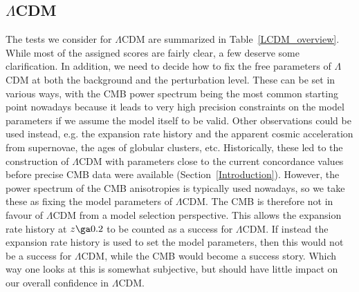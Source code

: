 \documentclass[fleqn,usenatbib,useAMS]{mnras} %
\begin{document}
\subsection{\texorpdfstring{$\Lambda$}{L}CDM}
\label{LCDM_comparison_section}

The tests we consider for $\Lambda$CDM are summarized in Table~\ref{LCDM_overview}. While most of the assigned scores are fairly clear, a few deserve some clarification. In addition, we need to decide how to fix the free parameters of $\Lambda$CDM at both the background and the perturbation level. These can be set in various ways, with the CMB power spectrum being the most common starting point nowadays because it leads to very high precision constraints on the model parameters if we assume the model itself to be valid. Other observations could be used instead, e.g. the expansion rate history and the apparent cosmic acceleration from supernovae, the ages of globular clusters, etc. Historically, these led to the construction of $\Lambda$CDM with parameters close to the current concordance values before precise CMB data were available (Section~\ref{Introduction}). However, the power spectrum of the CMB anisotropies is typically used nowadays, so we take these as fixing the model parameters of $\Lambda$CDM. The CMB is therefore not in favour of $\Lambda$CDM from a model selection perspective. This allows the expansion rate history at $z \ga 0.2$ to be counted as a success for $\Lambda$CDM. If instead the expansion rate history is used to set the model parameters, then this would not be a success for $\Lambda$CDM, while the CMB would become a success story. Which way one looks at this is somewhat subjective, but should have little impact on our overall confidence in $\Lambda$CDM.
\end{document}

